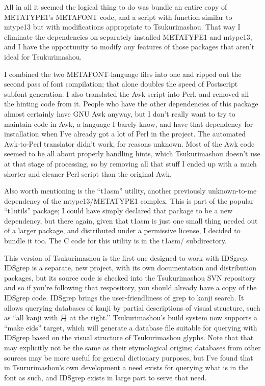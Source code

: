 \documentclass[14pt]{extarticle}
\begin{document}
All in all it seemed the logical thing to do was bundle an entire copy
of METATYPE1's METAFONT code, and a script with function similar to
mtype13 but with modifications appropriate to Tsukurimashou.  That way
I eliminate the dependencies on separately installed METATYPE1 and
mtype13, and I have the opportunity to modify any features of those
packages that aren't ideal for Tsukurimashou.

I combined the two METAFONT-language files into one and ripped out the
second pass of font compilation; that alone doubles the speed of
Postscript subfont generation.  I also translated the Awk script into
Perl, and removed all the hinting code from it.  People who have
the other dependencies of this package almost certainly have GNU Awk
anyway, but I don't really want to try to maintain code in Awk, a
language I barely know, and have that dependency for installation when
I've already got a lot of Perl in the project.  The automated
Awk-to-Perl translator didn't work, for reasons unknown.  Most of the
Awk code seemed to be all about properly handling hints, which
Tsukurimashou doesn't use at that stage of processing, so by removing
all that stuff I ended up with a much shorter and cleaner Perl script
than the original Awk.

Also worth mentioning is the ``t1asm'' utility, another previously
unknown-to-me dependency of the mtype13/METATYPE1 complex.  This is
part of the popular ``t1utils'' package; I could have simply declared
that package to be a new dependency, but there again, given that t1asm
is just one small thing needed out of a larger package, and distributed
under a permissive license, I decided to bundle it too.  The C code for
this utility is in the t1asm/ subdirectory.

This version of Tsukurimashou is the first one designed to work with
IDSgrep.  IDSgrep is a separate, new project, with its own
documentation and distribution packages, but its source code is checked
into the Tsukurimashou SVN repository and so if you're following that
respository, you should already have a copy of the IDSgrep code. 
IDSgrep brings the user-friendliness of grep to kanji search.  It
allows querying databases of kanji by partial descriptions of visual
structure, such as ``all kanji with 月 at the right.’’ Tsukurimashou's
build system now supports a ``make eids'' target, which will generate a
database file suitable for querying with IDSgrep based on the visual
structure of Tsukurimashou glyphs.  Note that that may explicitly not
be the same as their etymological origins; databases from other sources
may be more useful for general dictionary purposes, but I've found that
in Tsururimashou's own development a need exists for querying what
is in the font as such, and IDSgrep exists in large part to serve that
need.
\end{document}
